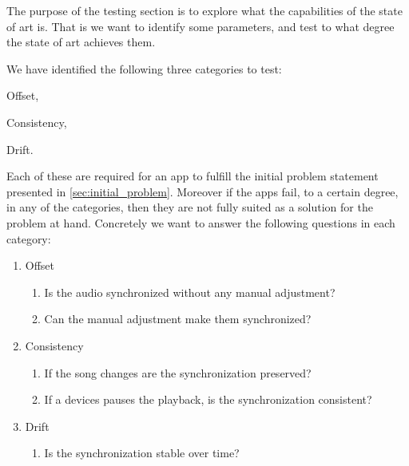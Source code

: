 The purpose of the testing section is to explore what the capabilities of the state of art is.
That is we want to identify some parameters, and test to what degree the state of art achieves them.

We have identified the following three categories to test:
\begin{enumerate*}[label=(\alph*)]
    \item Offset,
    \item Consistency,
    \item Drift.
\end{enumerate*}

Each of these are required for an app to fulfill the initial problem statement presented in \vref{sec:initial_problem}.
Moreover if the apps fail, to a certain degree, in any of the categories, then they are not fully suited as a solution for the problem at hand. 
Concretely we want to answer the following questions in each category:
\begin{enumerate}[label=(\alph*)]
    \item Offset
    \begin{enumerate}[label=(\arabic*)]
        \item Is the audio synchronized without any manual adjustment?
        \item Can the manual adjustment make them synchronized?
    \end{enumerate} 
    \item Consistency
    \begin{enumerate}[start=3,label=(\arabic*)]
        \item If the song changes are the synchronization preserved?
        \item If a devices pauses the playback, is the synchronization consistent?
    \end{enumerate}
    \item Drift
    \begin{enumerate}[start=6,label=(\arabic*)]
        \item Is the synchronization stable over time?
    \end{enumerate}
\end{enumerate}
